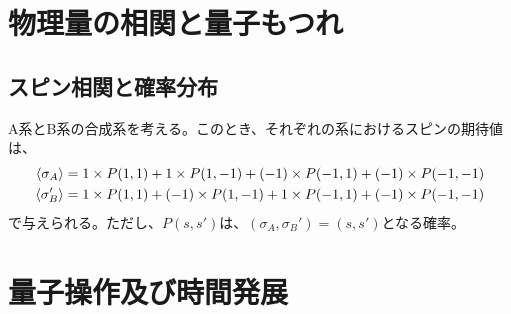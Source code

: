 \documentclass[a4paper,11pt]{jsarticle}
\begin{document}
\section{物理量の相関と量子もつれ}
\subsection{スピン相関と確率分布}
A系とB系の合成系を考える。このとき、それぞれの系におけるスピンの期待値は、
\begin{align}
    \ev{\sigma_A} =1\times P(1,1)+1\times P(1,-1)+(-1)\times P(-1,1)+(-1)\times P(-1,-1)\\
    \ev{\sigma_B '} =1\times P(1,1)+(-1)\times P(1,-1)+1\times P(-1,1)+(-1)\times P(-1,-1)\\
\end{align}
で与えられる。ただし、$P(s,s')$は、$(\sigma_A,\sigma_B ')=(s,s')$となる確率。\\

\section{量子操作及び時間発展}
\end{document}
